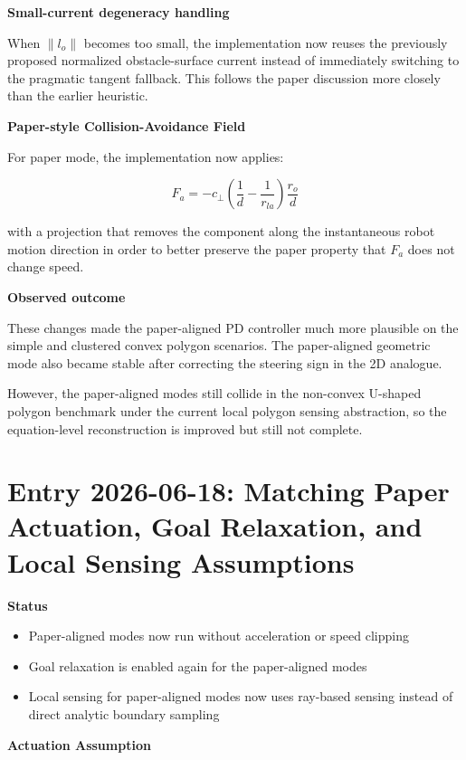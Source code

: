 \documentclass[11pt]{article}
\begin{document}
\textbf{Small-current degeneracy handling}

When \(\lVert l_o \rVert\) becomes too small, the implementation now reuses the
previously proposed normalized obstacle-surface current instead of immediately
switching to the pragmatic tangent fallback. This follows the paper discussion
more closely than the earlier heuristic.

\textbf{Paper-style Collision-Avoidance Field}

For paper mode, the implementation now applies:

\begin{equation}
F_a =
- c_{\perp}
\left(
\frac{1}{d} - \frac{1}{r_{la}}
\right)
\frac{r_o}{d}
\end{equation}

with a projection that removes the component along the instantaneous robot
motion direction in order to better preserve the paper property that \(F_a\)
does not change speed.

\textbf{Observed outcome}

These changes made the paper-aligned PD controller much more plausible on the
simple and clustered convex polygon scenarios. The paper-aligned geometric mode
also became stable after correcting the steering sign in the 2D analogue.

However, the paper-aligned modes still collide in the non-convex U-shaped
polygon benchmark under the current local polygon sensing abstraction, so the
equation-level reconstruction is improved but still not complete.

\section*{Entry 2026-06-18: Matching Paper Actuation, Goal Relaxation, and Local Sensing Assumptions}

\textbf{Status}

\begin{itemize}[leftmargin=*]
  \item Paper-aligned modes now run without acceleration or speed clipping
  \item Goal relaxation is enabled again for the paper-aligned modes
  \item Local sensing for paper-aligned modes now uses ray-based sensing instead of direct analytic boundary sampling
\end{itemize}

\textbf{Actuation Assumption}
\end{document}
